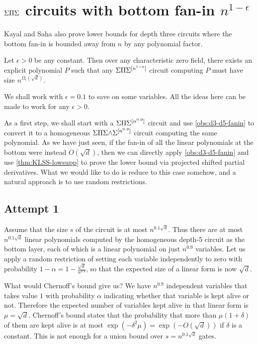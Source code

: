 \section{$\Sigma\Pi\Sigma$ circuits with bottom fan-in $n^{1-\epsilon}$}

Kayal and Saha \cite{KayalSaha14} also prove lower bounds for depth three circuits
where the bottom fan-in is bounded away from $n$ by any polynomial factor. 

\begin{theorem} Let $\epsilon > 0$ be any
  constant.
Then over any characteristic zero field, there exists an explicit polynomial $P$ such that any $\Sigma\Pi\Sigma^{[n^{1 - \varepsilon}]}$ circuit computing $P$ must have size $n^{\Omega_\epsilon(\sqrt{d})}$.
\end{theorem}

We shall work with $\epsilon = 0.1$ to save on some variables. All the ideas here can be made to work for any $\epsilon > 0$. 

As a first step, we shall start with a $\Sigma\Pi\Sigma^{[n^{0.9}]}$ circuit and use \autoref{obs:d3-d5-fanin} to convert it to a homogeneous $\Sigma\Pi\Sigma\mathord{\wedge}\Sigma^{[n^{0.9}]}$ circuit computing the same polynomial.
As we have just seen, if the fan-in of all the linear polynomials at the bottom were instead $O(\sqrt{d})$, then we can directly apply \autoref{obs:d3-d5-fanin} and use \autoref{thm:KLSS-lowsupp} to prove the lower bound via projected shifted partial derivatives.
What we would like to do is reduce to this case somehow, and a natural approach is to use random restrictions.

\subsection*{Attempt 1}


Assume that the size $s$ of the circuit is at most $n^{0.1\sqrt{d}}$.
Thus there are at most $n^{0.1 \sqrt{d}}$ linear polynomials computed by the homogeneous depth-$5$ circuit as the bottom layer, each of which is a linear polynomial on just $n^{0.9}$ variables.
Let us apply a random restriction of setting each variable independently to zero with probability $1 - \alpha = 1 - \frac{\sqrt{d}}{n^{0.9}}$, so that the expected size of a linear form is now $\sqrt{d}$.

What would Chernoff's bound give us?
We have $n^{0.9}$ independent variables that takes value $1$ with probability $\alpha$ indicating whether that variable is kept alive or not.
Therefore the expected number of variables kept alive in that linear form is $\mu = \sqrt{d}$.
Chernoff's bound states that the probability that more than $\mu (1 + \delta)$ of them are kept alive is at most $\exp(-\delta^2 \mu) = \exp(-O(\sqrt{d}))$ if $\delta$ is a constant.
This is not enough for a union bound over $s = n^{0.1\sqrt{d}}$ gates.

